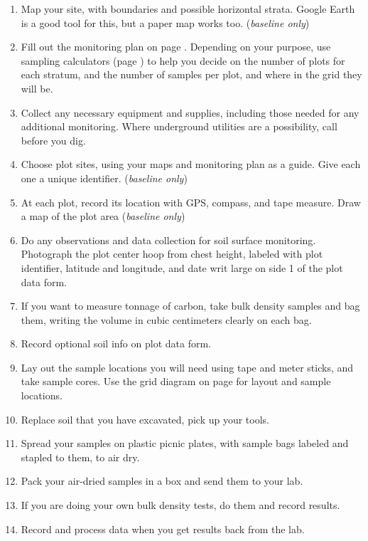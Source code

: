 \documentclass[11pt,letterpaper,oneside,onecolumn]{memoir}
\begin{document}
\begin{enumerate}

\item Map your site, with boundaries and possible horizontal strata. Google Earth is a good tool for this, but a paper map works too. (\textit{baseline only})

\item Fill out the monitoring plan on page \pageref{monitoringplan}. Depending on your purpose, use sampling calculators (page \pageref{spreadsheet tools}) to help you decide on the number of plots for each stratum, and the number of samples per plot, and where in the grid they will be.

\item Collect any necessary equipment and supplies, including those needed for any additional monitoring. Where underground utilities are a possibility, call before you dig.

\item Choose plot sites, using your maps and monitoring plan as a guide. Give each one a unique identifier. (\textit{baseline only})

\item At each plot, record its location with GPS, compass, and tape measure. Draw a map of the plot area (\textit{baseline only})

\item Do any observations and data collection for soil surface monitoring. Photograph the plot center hoop from chest height, labeled with plot identifier, latitude and longitude, and date writ large on side 1 of the plot data form.

\item If you want to measure tonnage of carbon, take bulk density samples and bag them, writing the volume in cubic centimeters clearly on each bag.

\item Record optional soil info on plot data form.

\item Lay out the sample locations you will need using tape and meter sticks, and take sample cores. Use the grid diagram on page \pageref{EZgrid} for layout and sample locations.

\item Replace soil that you have excavated, pick up your tools.

\item Spread your samples on plastic picnic plates, with sample bags labeled and stapled to them, to air dry.

\item Pack your air-dried samples in a box and send them to your lab.

\item If you are doing your own bulk density tests, do them and record results.

\item Record and process data when you get results back from the lab.

\end{enumerate}
\end{document}
